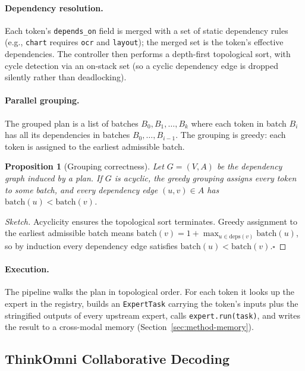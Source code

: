 \documentclass[11pt,a4paper]{article}
\newtheorem{proposition}{Proposition}
\begin{document}
\paragraph{Dependency resolution.}
Each token's \texttt{depends\_on} field is merged with a set of static
dependency rules (e.g., \texttt{chart} requires \texttt{ocr} and
\texttt{layout}); the merged set is the token's effective dependencies.
The controller then performs a depth-first topological sort, with
cycle detection via an on-stack set (so a cyclic dependency edge is
dropped silently rather than deadlocking).

\paragraph{Parallel grouping.}
The grouped plan is a list of batches $B_0, B_1, \dots, B_k$ where each
token in batch $B_i$ has all its dependencies in batches
$B_0, \dots, B_{i-1}$. The grouping is greedy: each token is assigned to
the earliest admissible batch.

\begin{proposition}[Grouping correctness]\label{prop:grouping}
Let $G = (V, A)$ be the dependency graph induced by a plan. If $G$ is
acyclic, the greedy grouping assigns every token to some batch, and
every dependency edge $(u, v) \in A$ has $\text{batch}(u) <
\text{batch}(v)$.
\end{proposition}

\begin{proof}[Sketch]
Acyclicity ensures the topological sort terminates. Greedy assignment to
the earliest admissible batch means $\text{batch}(v) = 1 + \max_{u \in
\text{deps}(v)}\text{batch}(u)$, so by induction every dependency edge
satisfies $\text{batch}(u) < \text{batch}(v)$.\hfill$\square$
\end{proof}

\paragraph{Execution.}
The pipeline walks the plan in topological order. For each token it
looks up the expert in the registry, builds an \texttt{ExpertTask}
carrying the token's inputs plus the stringified outputs of every
upstream expert, calls \texttt{expert.run(task)}, and writes the
result to a cross-modal memory (Section~\ref{sec:method-memory}).

\subsection{ThinkOmni Collaborative Decoding}\label{sec:method-think}
\end{document}

